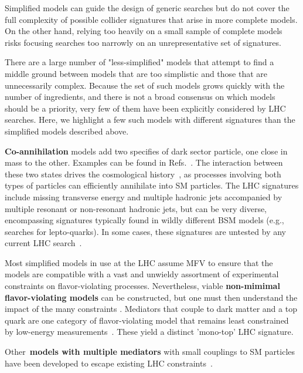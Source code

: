 
Simplified models can guide the design of generic searches but do not cover the full complexity of possible collider signatures that arise in more complete models.
On the other hand, relying too heavily on a small sample of complete models risks focusing searches too narrowly on an unrepresentative set of signatures.

There are a large number of "less-simplified" models that attempt to find a middle ground between models that are too simplistic and those that are unnecessarily complex. Because the set of such models grows quickly with the number of ingredients, and there is not a broad consensus on which models should be a priority, very few of them have been explicitly considered by LHC searches. Here, we highlight a few such models with different signatures than the simplified models described above. 

\textbf{Co-annihilation} models add two specifies of dark sector particle, one close in mass to the other. Examples can be found in Refs.~\cite{Buschmann:2016hkc,Baker:2015qna,Khoze:2017ixx}. The interaction between these two states drives the cosmological history~\cite{Ellis:1999mm,PlehnLecturesDM}, as processes involving both types of particles can efficiently annihilate into SM particles. The LHC signatures include missing transverse energy and multiple hadronic jets accompanied by multiple resonant or non-resonant hadronic jets, but can be very diverse, encompassing signatures typically found in wildly different BSM models (e.g., searches for lepto-quarks). In some cases, these signatures are untested by any current LHC search~\cite{Buschmann:2016hkc}. 

Most simplified models in use at the LHC assume MFV to ensure that the models are compatible with a vast and unwieldy assortment of experimental constraints on flavor-violating processes. Nevertheless, viable \textbf{non-mimimal flavor-violating models} can be constructed, but one must then understand the impact of the many constraints \cite{Blanke:2017tnb}. Mediators that couple to dark matter and a top quark are one category of flavor-violating model that remains least constrained by low-energy measurements~\cite{DHondt:2015nat}. These yield a distinct 'mono-top' LHC signature. 

Other~\textbf{models with multiple mediators} with small couplings to SM particles have been developed to escape existing LHC constraints~\cite{Duerr:2016tmh}. 

